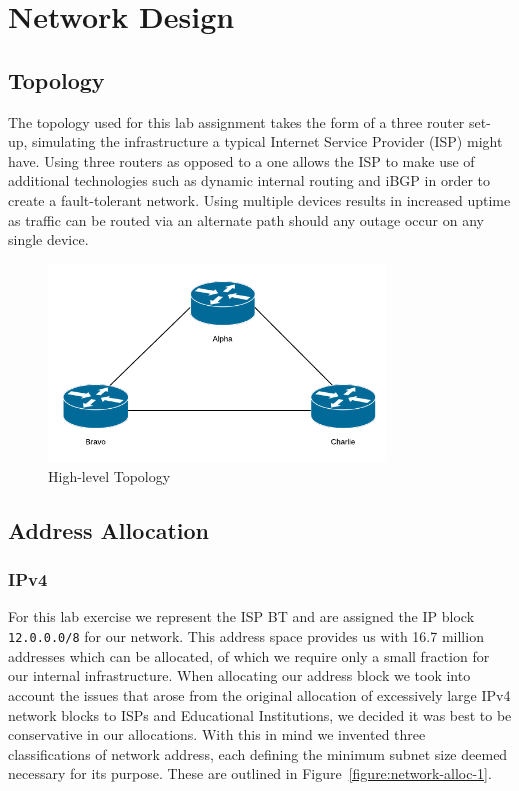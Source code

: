 \chapter{Network Design}

\section{Topology}

The topology used for this lab assignment takes the form of a three router set-
up, simulating the infrastructure a typical Internet Service Provider (ISP)
might have. Using three routers as opposed to a one allows the ISP to make use
of additional technologies such as dynamic internal routing and iBGP in order
to create a fault-tolerant network. Using multiple devices results in increased
uptime as traffic can be routed via an alternate path should any outage occur
on any single device.

\begin{figure}[!ht]     \caption{High-level Topology}     \centering
\includegraphics[width=0.8\textwidth]{images/networkTopology.png} \end{figure}

\section{Address Allocation} \subsection{IPv4} For this lab exercise we
represent the ISP BT and are assigned the IP block \texttt{12.0.0.0/8} for our
network. This address space provides us with 16.7 million addresses which can
be allocated, of which we require only a small fraction for our internal
infrastructure. When allocating our address block we took into account the
issues that arose from the original allocation of excessively large IPv4
network blocks to ISPs and Educational Institutions, we decided it was best to
be conservative in our allocations. With this in mind we invented three
classifications of network address, each defining the minimum subnet size
deemed necessary for its purpose. These are outlined in
Figure~\ref{figure:network-alloc-1}.

